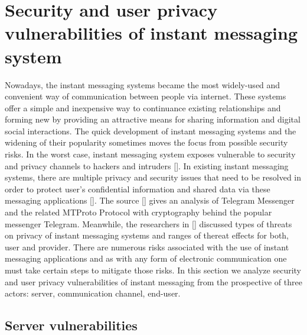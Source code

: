 \chapter{Security and user privacy vulnerabilities of instant messaging system}
\label{ch:security-and-user-privacy-vulnerabilities-of-instant-messaging-system}

Nowadays, the instant messaging systems became the most widely-used and convenient way of communication between
people via internet.
These systems offer a simple and inexpensive way to continuance existing relationships and forming new by providing an
attractive means for sharing information and digital social interactions.
The quick development of instant messaging systems and the widening of their popularity sometimes moves the
focus from possible security risks.
In the worst case, instant messaging system exposes vulnerable to security and privacy channels to hackers and intruders
[\cite{mcclure2009hacking, mannan2005secure}].
In existing instant messaging systems, there are multiple privacy and security issues that need to be resolved in order
to protect user's confidential information and shared data via these messaging applications [\cite{loesing2006privacy}].
The source [\cite{job2015modified}] gives an analysis of Telegram Messenger and the related MTProto Protocol with cryptography
behind the popular messenger Telegram.
Meanwhile, the researchers in [\cite{khan2015survey}] discussed types of threats on privacy of instant messaging systems
and ranges of thereat effects for both, user and provider.
There are numerous risks associated with the use of instant messaging applications and as with any form of
electronic communication one must take certain steps to mitigate those risks.
In this section we analyze security and user privacy vulnerabilities of instant messaging from the prospective of three
actors: server, communication channel, end-user.


%


\section{Server vulnerabilities}\label{sec:server-vulnerabilities}


